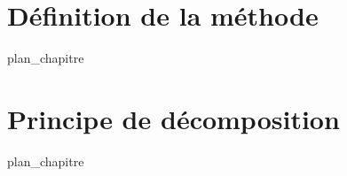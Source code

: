%
\chapter{Définition de la méthode }
\label{chap:04}
{plan_chapitre}
%
\chapter{Principe de décomposition }
\label{chap:05}
{plan_chapitre}
